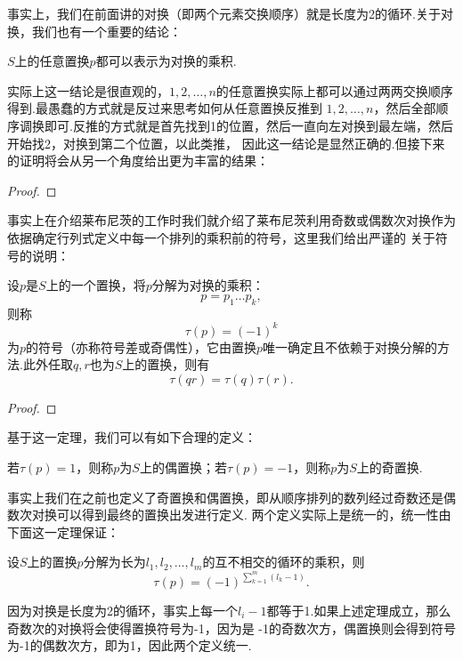 事实上，我们在前面讲的对换（即两个元素交换顺序）就是长度为2的循环.关于对换，我们也有一个重要的结论：
\begin{theorem}\label{thm:16:对换乘积}
    $S$上的任意置换$p$都可以表示为对换的乘积.
\end{theorem}

实际上这一结论是很直观的，$1,2,\ldots,n$的任意置换实际上都可以通过两两交换顺序得到.最愚蠢的方式就是反过来思考如何从任意置换反推到
$1,2,\ldots,n$，然后全部顺序调换即可.反推的方式就是首先找到1的位置，然后一直向左对换到最左端，然后开始找2，对换到第二个位置，以此类推，
因此这一结论是显然正确的.但接下来的证明将会从另一个角度给出更为丰富的结果：

\begin{proof}
    
\end{proof}

事实上在介绍莱布尼茨的工作时我们就介绍了莱布尼茨利用奇数或偶数次对换作为依据确定行列式定义中每一个排列的乘积前的符号，这里我们给出严谨的
关于符号的说明：
\begin{theorem}\label{thm:16:置换的符号}
    设$p$是$S$上的一个置换，将$p$分解为对换的乘积：
    \[p=p_1\ldots p_k,\]
    则称
    \[\tau(p)=(-1)^k\]
    为$p$的符号（亦称符号差或奇偶性），它由置换$p$唯一确定且不依赖于对换分解的方法.此外任取$q,r$也为$S$上的置换，则有
    \[\tau(qr)=\tau(q)\tau(r).\]
\end{theorem}
\begin{proof}
    
\end{proof}

基于这一定理，我们可以有如下合理的定义：
\begin{definition}
    若$\tau(p)=1$，则称$p$为$S$上的偶置换；若$\tau(p)=-1$，则称$p$为$S$上的奇置换.
\end{definition}

事实上我们在之前也定义了奇置换和偶置换，即从顺序排列的数列经过奇数还是偶数次对换可以得到最终的置换出发进行定义.
两个定义实际上是统一的，统一性由下面这一定理保证：
\begin{theorem}\label{thm:16:置换符号计算公式}
    设$S$上的置换$p$分解为长为$l_1,l_2,\ldots,l_m$的互不相交的循环的乘积，则
    \[\tau(p)=(-1)^{\sum\limits_{k=1}^m(l_k-1)}.\]
\end{theorem}

因为对换是长度为2的循环，事实上每一个$l_i-1$都等于1.如果上述定理成立，那么奇数次的对换将会使得置换符号为-1，因为是
-1的奇数次方，偶置换则会得到符号为-1的偶数次方，即为1，因此两个定义统一.

